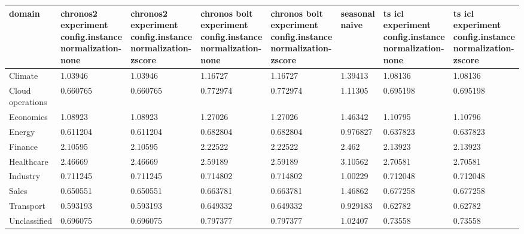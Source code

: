 \begin{tabular}{llllllll}
\toprule
domain & chronos2  experiment config.instance normalization-none & chronos2  experiment config.instance normalization-zscore & chronos bolt  experiment config.instance normalization-none & chronos bolt  experiment config.instance normalization-zscore & seasonal naive & ts icl  experiment config.instance normalization-none & ts icl  experiment config.instance normalization-zscore \\
\midrule
Climate & 1.03946 & 1.03946 & 1.16727 & 1.16727 & 1.39413 & 1.08136 & 1.08136 \\
Cloud operations & 0.660765 & 0.660765 & 0.772974 & 0.772974 & 1.11305 & 0.695198 & 0.695198 \\
Economics & 1.08923 & 1.08923 & 1.27026 & 1.27026 & 1.46342 & 1.10795 & 1.10796 \\
Energy & 0.611204 & 0.611204 & 0.682804 & 0.682804 & 0.976827 & 0.637823 & 0.637823 \\
Finance & 2.10595 & 2.10595 & 2.22522 & 2.22522 & 2.462 & 2.13923 & 2.13923 \\
Healthcare & 2.46669 & 2.46669 & 2.59189 & 2.59189 & 3.10562 & 2.70581 & 2.70581 \\
Industry & 0.711245 & 0.711245 & 0.714802 & 0.714802 & 1.00229 & 0.712048 & 0.712048 \\
Sales & 0.650551 & 0.650551 & 0.663781 & 0.663781 & 1.46862 & 0.677258 & 0.677258 \\
Transport & 0.593193 & 0.593193 & 0.649332 & 0.649332 & 0.929183 & 0.62782 & 0.62782 \\
Unclassified & 0.696075 & 0.696075 & 0.797377 & 0.797377 & 1.02407 & 0.73558 & 0.73558 \\
\bottomrule
\end{tabular}
